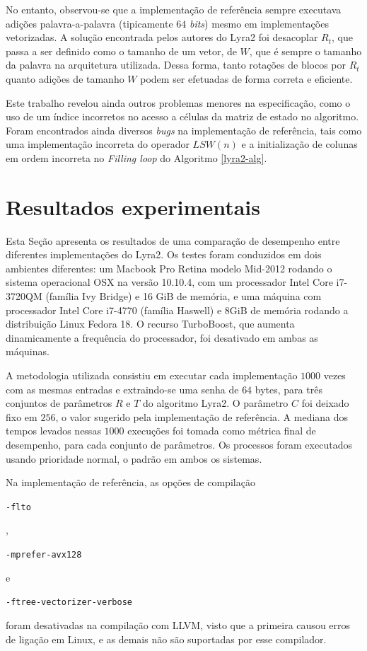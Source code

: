 \documentclass{article}
\begin{document}
No entanto, observou-se que a implementação de referência sempre executava
adições palavra-a-palavra (tipicamente $64$ \emph{bits}) mesmo em
implementações vetorizadas. A solução encontrada pelos autores do Lyra2 foi
desacoplar $R_{t}$, que passa a ser definido como o tamanho de um vetor, de
$W$, que é sempre o tamanho da palavra na arquitetura utilizada. Dessa forma,
tanto rotações de blocos por $R_{t}$ quanto adições de tamanho $W$ podem ser
efetuadas de forma correta e eficiente.

Este trabalho revelou ainda outros problemas menores na especificação, como o
uso de um índice incorretos no acesso a células da matriz de estado no
algoritmo. Foram encontrados ainda diversos \emph{bugs} na implementação de
referência, tais como uma implementação incorreta do operador $LSW(n)$ e a
initialização de colunas em ordem incorreta no \emph{Filling loop} do Algoritmo
\ref{lyra2-alg}.

\section{Resultados experimentais }
\label{sec-experimental}

Esta Seção apresenta os resultados de uma comparação de desempenho entre
diferentes implementações do Lyra2. Os testes foram conduzidos em
dois ambientes diferentes: um Macbook Pro Retina modelo Mid-2012 rodando
o sistema operacional OSX na versão 10.10.4, com um processador Intel
Core i7-3720QM (família Ivy Bridge) e 16 GiB de memória, e uma máquina
com processador Intel Core i7-4770 (família Haswell) e 8GiB de memória
rodando a distribuição Linux Fedora 18. O recurso TurboBoost, que
aumenta dinamicamente a frequência do processador, foi desativado em
ambas as máquinas.

A metodologia utilizada consistiu em executar cada implementação
$1000$ vezes com as mesmas entradas e extraindo-se uma senha de $64$
bytes, para três conjuntos de parâmetros $R$ e $T$ do algoritmo
Lyra2. O parâmetro $C$ foi deixado fixo em $256$, o valor sugerido
pela implementação de referência. A mediana dos tempos levados nessas
$1000$ execuções foi tomada como métrica final de desempenho, para
cada conjunto de parâmetros. Os processos foram executados usando
prioridade normal, o padrão em ambos os sistemas.

Na implementação de referência, as opções de compilação
\begin{small}\verb|-flto|\end{small},
\begin{small}\verb|-mprefer-avx128|\end{small} e
\begin{small}\verb|-ftree-vectorizer-verbose|\end{small} foram desativadas na
compilação com LLVM, visto que a primeira causou erros de ligação em Linux, e
as demais não são suportadas por esse compilador.
\end{document}
